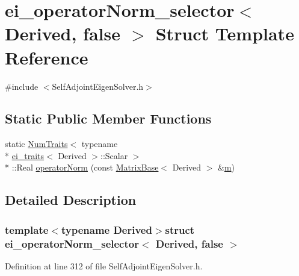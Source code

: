 \hypertarget{structei__operator_norm__selector_3_01_derived_00_01false_01_4}{\section{ei\-\_\-operator\-Norm\-\_\-selector$<$ Derived, false $>$ Struct Template Reference}
\label{structei__operator_norm__selector_3_01_derived_00_01false_01_4}
}


{\ttfamily \#include $<$Self\-Adjoint\-Eigen\-Solver.\-h$>$}

\subsection*{Static Public Member Functions}
\begin{DoxyCompactItemize}
\item 
static \hyperlink{struct_num_traits}{Num\-Traits}$<$ typename \\*
\hyperlink{structei__traits}{ei\-\_\-traits}$<$ Derived $>$\-::Scalar $>$\\*
\-::Real \hyperlink{structei__operator_norm__selector_3_01_derived_00_01false_01_4_a0763a7640eb78af00678df3fad91cec3}{operator\-Norm} (const \hyperlink{class_matrix_base}{Matrix\-Base}$<$ Derived $>$ \&\hyperlink{glext_8h_af593500c283bf1a787a6f947f503a5c2}{m})
\end{DoxyCompactItemize}


\subsection{Detailed Description}
\subsubsection*{template$<$typename Derived$>$struct ei\-\_\-operator\-Norm\-\_\-selector$<$ Derived, false $>$}



Definition at line 312 of file Self\-Adjoint\-Eigen\-Solver.\-h.



